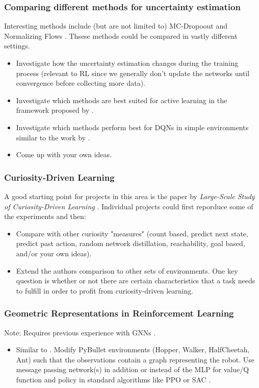 \documentclass[a4paper]{article}
\begin{document}
\subsubsection{Comparing different methods for uncertainty estimation}
\label{sec:uncertainty-estimation}
Interesting methods include (but are not limited to) MC-Dropoout \cite{Gal2016} and Normalizing Flows \cite{louizos2017multiplicative}. Thsese methods could be compared in vastly different settings.
\begin{itemize}
    \item Investigate how the uncertainty estimation changes during the training process (relevant to RL since we generally don’t update the networks until convergence before collecting more data).
    \item Investigate which methods are best suited for active learning in the framework proposed by \cite{gal2017active}.
    \item Investigate which methods perform best for DQNs in simple environments similar to the work by \cite{touati2018randomized}.
    \item Come up with your own ideas.
\end{itemize}

\subsubsection{Curiosity-Driven Learning}
A good starting point for projects in this area is the paper by \textit{Large-Scale Study of Curiosity-Driven Learning} \cite{burda2018largescale}. Individual projects could first reporduce some of the experiments and then:
\begin{itemize}
    \item Compare with other curiosity "measures" (count based, predict next state, predict past action, random network distillation, reachability, goal based, and/or your own ideas).
    \item Extend the authors comparison to other sets of environments. One key question is whether or not there are certain characteristics that a task needs to fulfill in order to profit from curiosity-driven learning.
\end{itemize}

\subsubsection{Geometric Representations in Reinforcement Learning}
Note: Requires previous experience with GNNs \cite{kipf2016semisupervised}.
\begin{itemize}
    \item Similar to \cite{Wang2018nervenet}. Modify PyBullet environments (Hopper, Walker, HalfCheetah, Ant) such that the observations contain a graph representing the robot. Use message passing network(s) in addition or instead of the MLP for value/Q function and policy in standard algorithms like PPO \cite{Schulman2017} or SAC \cite{Haarnoja2018a}.
\end{itemize}
\end{document}
